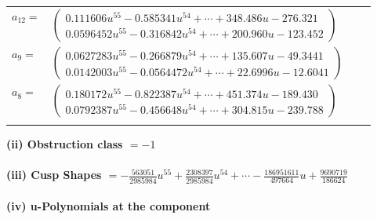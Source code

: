 \documentclass[1p]{elsarticle_modified}
\theoremstyle{definition}
\begin{document}
\begin{tabular}{m{7pt} m{180pt} m{7pt} m{180pt} }
\flushright $a_{12}=$&$\begin{pmatrix}0.111606 u^{55}-0.585341 u^{54}+\cdots+348.486 u-276.321\\0.0596452 u^{55}-0.316842 u^{54}+\cdots+200.960 u-123.452\end{pmatrix}$ \\
\flushright $a_{9}=$&$\begin{pmatrix}0.0627283 u^{55}-0.266879 u^{54}+\cdots+135.607 u-49.3441\\0.0142003 u^{55}-0.0564472 u^{54}+\cdots+22.6996 u-12.6041\end{pmatrix}$ \\
\flushright $a_{8}=$&$\begin{pmatrix}0.180172 u^{55}-0.822387 u^{54}+\cdots+451.374 u-189.430\\0.0792387 u^{55}-0.456648 u^{54}+\cdots+304.815 u-239.788\end{pmatrix}$\\&\end{tabular}
\flushleft \textbf{(ii) Obstruction class $= -1$}\\~\\
\flushleft \textbf{(iii) Cusp Shapes $= -\frac{563051}{2985984} u^{55}+\frac{2308397}{2985984} u^{54}+\cdots-\frac{186951611}{497664} u+\frac{9690719}{186624}$}\\~\\
\newpage\renewcommand{\arraystretch}{1}
\flushleft \textbf{(iv) u-Polynomials at the component}\newline \\
\end{document}
